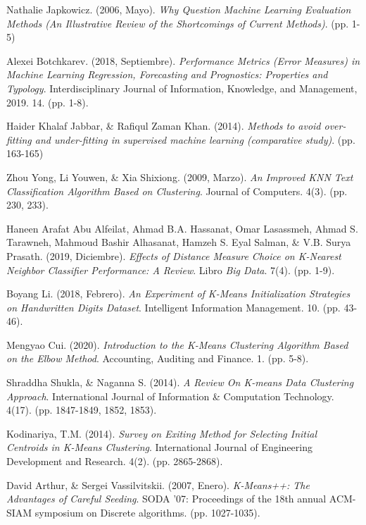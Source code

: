\documentclass[12pt,a4paper]{article}
\begin{document}
\begin{sloppypar}
\begin{thebibliography}{9}
Nathalie Japkowicz. (2006, Mayo). \textit{Why Question Machine Learning Evaluation Methods (An Illustrative Review of the Shortcomings of Current Methods)}. (pp. 1-5)

Alexei Botchkarev. (2018, Septiembre). \textit{Performance Metrics (Error Measures) in Machine Learning Regression, Forecasting and Prognostics: Properties and Typology}. Interdisciplinary Journal of Information, Knowledge, and Management, 2019. 14. (pp. 1-8).

Haider Khalaf Jabbar, \& Rafiqul Zaman Khan. (2014). \textit{Methods to avoid over-fitting and under-fitting in supervised machine learning (comparative study)}. (pp. 163-165)

Zhou Yong, Li Youwen, \& Xia Shixiong. (2009, Marzo). \textit{An Improved KNN Text Classification Algorithm Based on Clustering}. Journal of Computers. 4(3). (pp. 230, 233). 

Haneen Arafat Abu Alfeilat, Ahmad B.A. Hassanat, Omar Lasassmeh, Ahmad S. Tarawneh, Mahmoud Bashir Alhasanat, Hamzeh S. Eyal Salman, \& V.B. Surya Prasath. (2019, Diciembre). \textit{Effects of Distance Measure Choice on K-Nearest Neighbor Classifier Performance: A Review}. Libro \textit{Big Data}. 7(4). (pp. 1-9).

Boyang Li. (2018, Febrero). \textit{An Experiment of K-Means Initialization Strategies on Handwritten Digits Dataset}. Intelligent Information Management. 10. (pp. 43-46). 

Mengyao Cui. (2020). \textit{Introduction to the K-Means Clustering Algorithm Based on the Elbow Method}. Accounting, Auditing and Finance. 1. (pp. 5-8).

Shraddha Shukla, \& Naganna S. (2014). \textit{A Review On K-means Data Clustering Approach}. International Journal of Information \& Computation Technology. 4(17). (pp. 1847-1849, 1852, 1853).

Kodinariya, T.M. (2014). \textit{Survey on Exiting Method for Selecting Initial Centroids in K-Means Clustering}. International Journal of Engineering Development and Research. 4(2). (pp. 2865-2868).

David Arthur, \& Sergei Vassilvitskii. (2007, Enero). \textit{K-Means++: The Advantages of Careful Seeding}. SODA '07: Proceedings of the 18th annual ACM-SIAM symposium on Discrete algorithms. (pp. 1027-1035).


\end{thebibliography}
\end{sloppypar}
\end{document}
